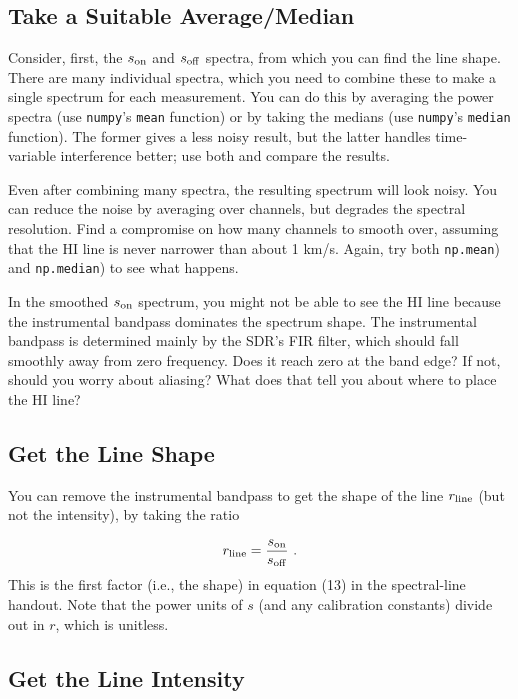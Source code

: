 \documentclass[11pt,preprint]{aastex}
\begin{document}
\subsection{Take a Suitable Average/Median}

\noindent
Consider, first, the $s_{\rm on}$ and $s_{\rm off}$ spectra, from which
you can find the line shape. There are many individual spectra, which
you need to combine these to make a single spectrum
for each measurement. You can do this by averaging the power spectra
(use {\tt numpy}'s {\tt mean} function) or by taking the medians (use {\tt numpy}'s
{\tt median} function). The former gives a less noisy result, but the
latter handles time-variable interference better; use both and compare
the results.

Even after combining many spectra, the resulting
spectrum will look noisy.  You can reduce the noise by averaging
over channels, but
degrades the spectral resolution. Find a compromise on
how many channels to smooth over, assuming that the HI line is
never narrower than about 1 km/s.
Again, try both {\tt np.mean}) and {\tt np.median}) to see what happens.

In the smoothed $s_{\rm on}$ spectrum, you might not be able to see the
HI line because the instrumental bandpass dominates the spectrum
shape. The instrumental bandpass is determined mainly by the SDR's FIR
filter, which should fall smoothly away from zero frequency.
Does it reach zero at the band edge? If not, should you worry about aliasing?
What does that tell you about where to place the HI line?

\subsection{Get the Line Shape}

You can remove the instrumental bandpass to get the shape
of the line $r_{\rm line}$ (but not the intensity), by taking the ratio 

\begin{equation}
r_{\rm line} = \frac{s_{\rm on}}{s_{\rm off}} \ .
\end{equation}
%
This is the first factor (i.e., the shape) in equation
(13) in the spectral-line handout. Note that the power units of $s$ (and any calibration constants) divide out in $r$, which is
unitless.
%
\subsection{Get the Line Intensity}
\end{document}
